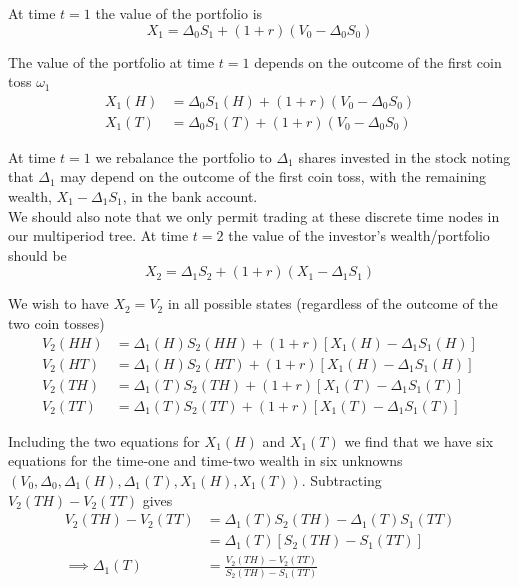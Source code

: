 \documentclass[12pt]{article}
\newlength\tindent
\renewcommand{\indent}{\hspace*{\tindent}}
\begin{document}
At time $t = 1$ the value of the portfolio is
\begin{equation*}
	X_1 = \Delta_0S_1 + (1 + r)(V_0 - \Delta_0S_0)
\end{equation*}

The value of the portfolio at time $t = 1$ depends on the outcome of the first coin toss $\omega_1$
\begin{align*}
	X_1(H) &= \Delta_0S_1(H) + (1 + r)(V_0 - \Delta_0S_0) \\
	X_1(T) &= \Delta_0S_1(T) + (1 + r)(V_0 - \Delta_0S_0)
\end{align*}

\indent At time $t = 1$ we rebalance the portfolio to $\Delta_1$ shares invested in the stock noting that $\Delta_1$ may depend on the outcome of the first coin toss, with the remaining wealth, $X_1 - \Delta_1S_1$, in the bank account. \\

\indent We should also note that we only permit trading at these discrete time nodes in our multiperiod tree. At time $t = 2$ the value of the investor's wealth/portfolio should be
\begin{equation*}
	X_2 = \Delta_1S_2 + (1 + r)(X_1 - \Delta_1S_1)
\end{equation*}

\indent We wish to have $X_2 = V_2$ in all possible states (regardless of the outcome of the two coin tosses)
\begin{align*}
	V_2(HH) &= \Delta_1(H)S_2(HH) + (1 + r)[X_1(H) - \Delta_1S_1(H)] \\
	V_2(HT) &= \Delta_1(H)S_2(HT) + (1 + r)[X_1(H) - \Delta_1S_1(H)] \\
	V_2(TH) &= \Delta_1(T)S_2(TH) + (1 + r)[X_1(T) - \Delta_1S_1(T)] \\
	V_2(TT) &= \Delta_1(T)S_2(TT) + (1 + r)[X_1(T) - \Delta_1S_1(T)]
\end{align*}

\indent Including the two equations for $X_1(H)$ and $X_1(T)$ we find that we have six equations for the time-one and time-two wealth in six unknowns $(V_0,\Delta_0,\Delta_1(H),\Delta_1(T),X_1(H),X_1(T))$. Subtracting $V_2(TH) - V_2(TT)$ gives 
\begin{align*}
	V_2(TH) - V_2(TT) &= \Delta_1(T)S_2(TH) - \Delta_1(T)S_1(TT) \\
	&= \Delta_1(T)\left[S_2(TH) - S_1(TT)\right] \\
	\implies \Delta_1(T) &= \frac{V_2(TH) - V_2(TT)}{S_2(TH) - S_1(TT)}
\end{align*}
\end{document}
